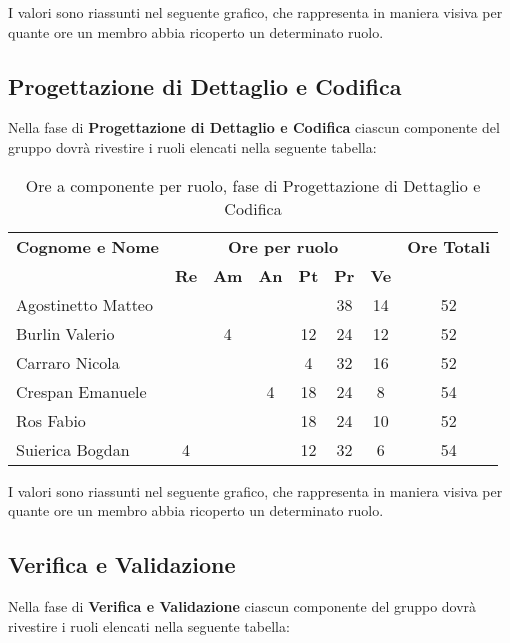 I valori sono riassunti nel seguente grafico, che rappresenta in maniera visiva per quante ore un membro abbia ricoperto un determinato ruolo.

\subsection{Progettazione di Dettaglio e Codifica}
Nella fase di \textbf{Progettazione di Dettaglio e Codifica} ciascun componente del gruppo dovrà rivestire i ruoli elencati nella seguente tabella:

\begin{table}[h]
	\centering
	\begin{tabular}{|l|c|c|c|c|c|c|c|}
		\toprule
		\textbf{Cognome e Nome} & \multicolumn{6}{c}{\textbf{Ore per ruolo}} & \textbf{Ore Totali} \\
		& \textbf{Re} & \textbf{Am} & \textbf{An} & \textbf{Pt} & \textbf{Pr} & \textbf{Ve} & \\
		
		\midrule
		Agostinetto Matteo & & & & & 38 & 14 & 52 \\
		Burlin Valerio & & 4 & & 12 & 24 & 12 & 52 \\ 
		Carraro Nicola & & & & 4 & 32 & 16 & 52 \\
		Crespan Emanuele & & & 4 & 18 & 24 & 8 & 54 \\
		Ros Fabio & & & & 18 & 24 & 10 & 52 \\
		Suierica Bogdan & 4 & & & 12 & 32 & 6 & 54 \\
		
		\bottomrule
	\end{tabular}
	\caption{Ore a componente per ruolo, fase di Progettazione di Dettaglio e Codifica}
\end{table}

I valori sono riassunti nel seguente grafico, che rappresenta in maniera visiva per quante ore un membro abbia ricoperto un determinato ruolo.

\subsection{Verifica e Validazione}
Nella fase di \textbf{Verifica e Validazione} ciascun componente del gruppo dovrà rivestire i ruoli elencati nella seguente tabella:

